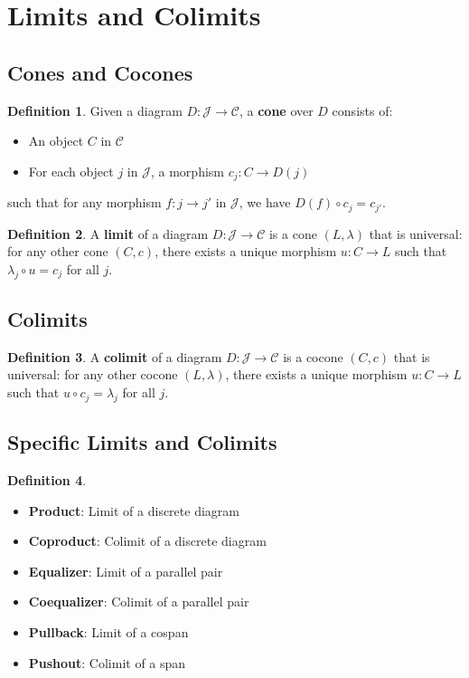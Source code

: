 \documentclass[11pt]{article}
\theoremstyle{definition}
\newtheorem{definition}{Definition}[section]
\begin{document}
\section{Limits and Colimits}

\subsection{Cones and Cocones}
\begin{definition}
Given a diagram $D: \mathcal{J} \to \mathcal{C}$, a \textbf{cone} over $D$ consists of:
\begin{itemize}
    \item An object $C$ in $\mathcal{C}$
    \item For each object $j$ in $\mathcal{J}$, a morphism $c_j: C \to D(j)$
\end{itemize}
such that for any morphism $f: j \to j'$ in $\mathcal{J}$, we have $D(f) \circ c_j = c_{j'}$.
\end{definition}

\begin{definition}
A \textbf{limit} of a diagram $D: \mathcal{J} \to \mathcal{C}$ is a cone $(L, \lambda)$ that is universal: for any other cone $(C, c)$, there exists a unique morphism $u: C \to L$ such that $\lambda_j \circ u = c_j$ for all $j$.
\end{definition}

\subsection{Colimits}
\begin{definition}
A \textbf{colimit} of a diagram $D: \mathcal{J} \to \mathcal{C}$ is a cocone $(C, c)$ that is universal: for any other cocone $(L, \lambda)$, there exists a unique morphism $u: C \to L$ such that $u \circ c_j = \lambda_j$ for all $j$.
\end{definition}

\subsection{Specific Limits and Colimits}
\begin{definition}
\begin{itemize}
    \item \textbf{Product}: Limit of a discrete diagram
    \item \textbf{Coproduct}: Colimit of a discrete diagram
    \item \textbf{Equalizer}: Limit of a parallel pair
    \item \textbf{Coequalizer}: Colimit of a parallel pair
    \item \textbf{Pullback}: Limit of a cospan
    \item \textbf{Pushout}: Colimit of a span
\end{itemize}
\end{definition}
\end{document}
